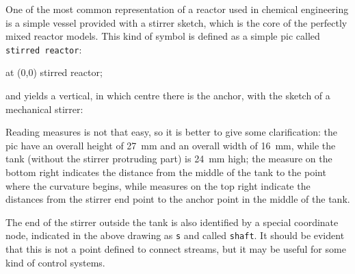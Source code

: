 \documentclass[12pt]{article}						%
\newcommand*{\chpn}[1]{\texttt{#1}}				%
\newcommand*{\chpp}[1]{\texttt{#1}}				%
\begin{document}
One of the most common representation of a reactor used in chemical engineering
is a simple vessel provided with a stirrer sketch, which is the core of the
perfectly mixed reactor models. This kind of symbol is defined as a simple pic
called \chpp{stirred reactor}:
\begin{chpcode}
	\pic at (0,0) {stirred reactor};
\end{chpcode}
and yields a vertical, in which centre there is the anchor, with the sketch  of a
mechanical stirrer:
\begin{center}
\end{center}

Reading measures is not that easy, so it is better to give some clarification:
the pic have an overall height of \SI{27}{\mm} and an overall width of
\SI{16}{\mm}, while the tank (without the stirrer protruding part) is
\SI{24}{\mm} high; the measure on the bottom right indicates the distance from
the middle of the tank to the point where the curvature begins, while measures on
the top right indicate the distances from the stirrer end point to the anchor
point in the middle of the tank.

The end of the stirrer outside the tank is also identified by a special
coordinate node, indicated in the above drawing as \chpn{s} and called
\chpn{shaft}. It should be evident that this is not a point defined to connect
streams, but it may be useful for some kind of control systems.
\end{document}
